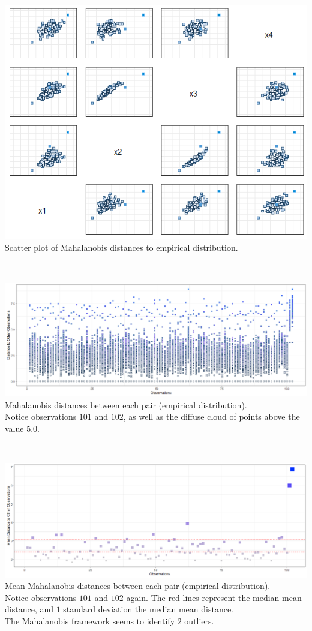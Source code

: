 \documentclass[20pt,landscape,footrule,headrule]{foils}
\begin{document}
\newpage\ \begin{center}
\includegraphics[height=0.85\textheight]{Images/Artificial_4D_Dataset_Md_scores} \\ Scatter plot of Mahalanobis distances to empirical distribution.
\end{center}\newpage\ \\  \begin{center}
\includegraphics[width=\textwidth]{Images/Artificial_4D_Datasets_Pairs} \\ Mahalanobis distances between each pair (empirical distribution). \\ Notice observations $101$ and $102$, as well as the diffuse cloud of points above the value $5.0$.
\end{center}\newpage\ \\  \begin{center}
\includegraphics[width=\textwidth]{Images/Artificial_4D_Dataset_MeanDist} \\ Mean Mahalanobis distances between each pair (empirical distribution). \\ Notice observations $101$ and $102$ again. The red lines represent the median mean distance, and $1$ standard deviation the median mean distance. \\ The Mahalanobis framework seems to identify $2$ outliers. 

\end{center}
\end{document}
